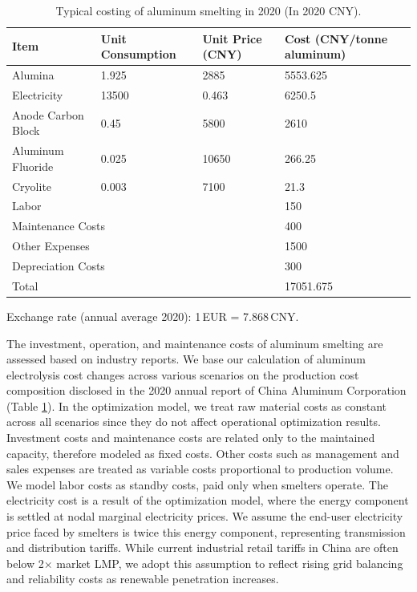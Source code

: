 \documentclass[preprint,12pt]{elsarticle}
\begin{document}
\begin{table}[htbp]
  \centering
\caption{Typical costing of aluminum smelting in 2020 (In 2020 CNY).}
  \label{tab:smelter_costing}
  \footnotesize %
  \setlength{\tabcolsep}{3pt} %
  \begin{tabular}{llll}
    \hline
    Item                & Unit Consumption & Unit Price (CNY) & Cost (CNY/tonne aluminum) \\ \hline
    Alumina             & 1.925            & 2885             & 5553.625   \\
    Electricity         & 13500            & 0.463            & 6250.5     \\
    Anode Carbon Block  & 0.45             & 5800             & 2610       \\
    Aluminum Fluoride   & 0.025            & 10650            & 266.25     \\
    Cryolite            & 0.003            & 7100             & 21.3       \\
    Labor               &                  &                  & 150        \\
    \multicolumn{2}{l}{Maintenance Costs}  &                  & 400        \\
    \multicolumn{2}{l}{Other   Expenses}   &                  & 1500       \\
    \multicolumn{2}{l}{Depreciation Costs} &                  & 300        \\
    Total               &                  &                  & 17051.675  \\ \hline
    \end{tabular}
\vspace{0.2em}

\raggedright
\footnotesize
Exchange rate (annual average 2020): 1\,EUR = 7.868\,CNY.
\normalsize
\end{table}

The investment, operation, and maintenance costs of aluminum smelting are assessed based on industry reports. We base our calculation of aluminum electrolysis cost changes across various scenarios on the production cost composition disclosed in the 2020 annual report of China Aluminum Corporation (Table \ref{tab:smelter_costing}). In the optimization model, we treat raw material costs as constant across all scenarios since they do not affect operational optimization results. Investment costs and maintenance costs are related only to the maintained capacity, therefore modeled as fixed costs. Other costs such as management and sales expenses are treated as variable costs proportional to production volume. We model labor costs as standby costs, paid only when smelters operate. The electricity cost is a result of the optimization model, where the energy component is settled at nodal marginal electricity prices. We assume the end-user electricity price faced by smelters is twice this energy component, representing transmission and distribution tariffs. While current industrial retail tariffs in China are often below 2$\times$ market LMP, we adopt this assumption to reflect rising grid balancing and reliability costs as renewable penetration increases.
\end{document}
